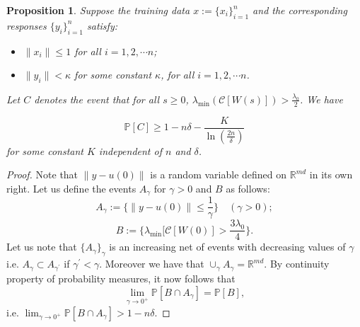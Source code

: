 \documentclass[a4paper,11pt]{amsart}
\newcommand{\IP}{\mathbb{P}}
\theoremstyle{definition}
\theoremstyle{plain}
\newtheorem{ppsn}[dfn]{Proposition}
\theoremstyle{remark}
\newcommand{\IR}{\mathbb{R}}
\begin{document}
\begin{ppsn}\label{Proposition: Main theorem}
Suppose the training data $x:=\{x_i\}_{i=1}^n$ and the corresponding responses $\{y_i\}_{i=1}^n$ satisfy:
\begin{itemize}
    \item 
$\|x_i\|\leq1$ for all $i=1,2,\cdots n$;
\item
$\|y_i\|<\kappa$ for some constant $\kappa$, for all $i=1,2,\cdots n$.
\end{itemize}
Let $C$ denotes the event that for all $s\geq0$, $\lambda_{\min}(\mathcal{C}[W(s)])>\frac{\lambda_0}{2}$. We have

\[\IP[C]\geq1-n\delta-\frac{K}{\ln(\frac{2n}{\delta})}\]
for some constant $K$ independent of $n$ and $\delta$.
\end{ppsn}
\begin{proof}
Note that $\|y-u(0)\|$ is a random variable defined on $\IR^{md}$ in its own right. Let us define the events $A_\gamma$ for $\gamma>0$ and $B$ as follows:
\[
A_\gamma:=\Big\{\|y-u(0)\|\leq\frac{1}{\gamma}\Big\}\quad(\gamma>0); 
\]
\[
B:=\Big\{\lambda_{\min}[\mathcal{C}[W(0)]>\frac{3\lambda_0}{4}\Big\}. 
\]
Let us note that $\{A_\gamma\}_\gamma$ is an increasing net of events with decreasing values of $\gamma$ i.e. $A_\gamma\subset A_{\gamma^\prime}$ if $\gamma^\prime<\gamma$. Moreover we have that $\cup_{\gamma}A_\gamma=\IR^{md}$. By continuity property of probability measures, it now follows that 
\[
\lim_{\gamma\longrightarrow0^+}\IP[B\cap A_\gamma]=\IP[B], 
\]
i.e. $\lim_{\gamma\longrightarrow0^+}\IP[B\cap A_\gamma]>1-n\delta$. 


\end{proof}
\end{document}
